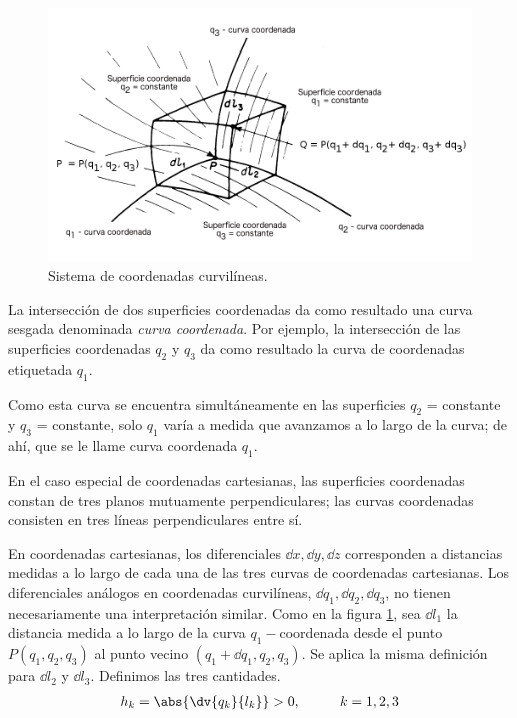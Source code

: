 \begin{figure}[H]
    \centering
    \includegraphics[scale=0.35]{Imagenes/CoordenadasCurvilineas_01.png}
    \caption{Sistema de coordenadas curvilíneas.}
    \label{fig:figura_A_01}
\end{figure}
La intersección de dos superficies coordenadas da como resultado una curva sesgada denominada \emph{curva coordenada}. Por ejemplo, la intersección de las superficies coordenadas $q_{2}$ y $q_{3}$ da como resultado la curva de coordenadas etiquetada $q_{1}$.
\par
Como esta curva se encuentra simultáneamente en las superficies $q_{2}$ = constante y $q_{3}$ = constante, solo $q_{1}$ varía a medida que avanzamos a lo largo de la curva; de ahí, que se le llame curva coordenada $q_{1}$.
\par
En el caso especial de coordenadas cartesianas, las superficies coordenadas constan de tres planos mutuamente perpendiculares; las curvas coordenadas consisten en tres líneas perpendiculares entre sí.
\par
En coordenadas cartesianas, los diferenciales $\dd{x}, \dd{y}, \dd{z}$ corresponden a distancias medidas a lo largo de cada una de las tres curvas de coordenadas cartesianas. Los diferenciales análogos en coordenadas curvilíneas, $\dd{q_{1}}, \dd{q_{2}}, \dd{q_{3}}$, no tienen necesariamente una interpretación similar. Como en la figura \ref{fig:figura_A_01}, sea $\dd{l_{1}}$ la distancia medida a lo largo de la curva $q_{1}-$coordenada desde el punto $P (q_{1}, q_{2}, q_{3})$ al punto vecino $(q_{1} + \dd{q_{1}}, q_{2}, q_{3})$. Se aplica la misma definición para $\dd{l_{2}}$ y $\dd{l_{3}}$. Definimos las tres cantidades.
\begin{align}
h_{k} =  \abs{\dv{q_{k}}{l_{k}}} > 0, \hspace{1cm} k = 1, 2, 3
\label{eq:ecuacion_A_01_04}    
\end{align}
